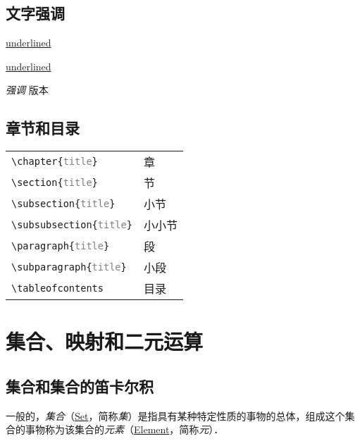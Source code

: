 \newpage
\section{文字强调}

\underline{underlined} %

\uline{underlined}     %

\emph{强调} 版本

\section{章节和目录}

\begin{table}[h]
\centering
\begin{tabular}{l l}
	\hline
	\texttt{\textbackslash chapter\{\textcolor{gray}{title}\}}       & 章 \\
	\texttt{\textbackslash section\{\textcolor{gray}{title}\}}       & 节 \\
	\texttt{\textbackslash subsection\{\textcolor{gray}{title}\}}    & 小节 \\
	\texttt{\textbackslash subsubsection\{\textcolor{gray}{title}\}} & 小小节 \\
	\texttt{\textbackslash paragraph\{\textcolor{gray}{title}\}}     & 段 \\
	\texttt{\textbackslash subparagraph\{\textcolor{gray}{title}\}}  & 小段 \\
	\verb|\tableofcontents|                                          & 目录 \\
	\hline
\end{tabular}
\end{table}

\chapter{集合、映射和二元运算}

\section{集合和集合的笛卡尔积}

一般的，\emph{集合}（\href{http://mathworld.wolfram.com/Set.html}{Set}，简称\emph{集}）是指具有某种特定性质的事物的总体，组成这个集合的事物称为该集合的\emph{元素}（\href{http://mathworld.wolfram.com/Element.html}{Element}，简称\emph{元}）．

